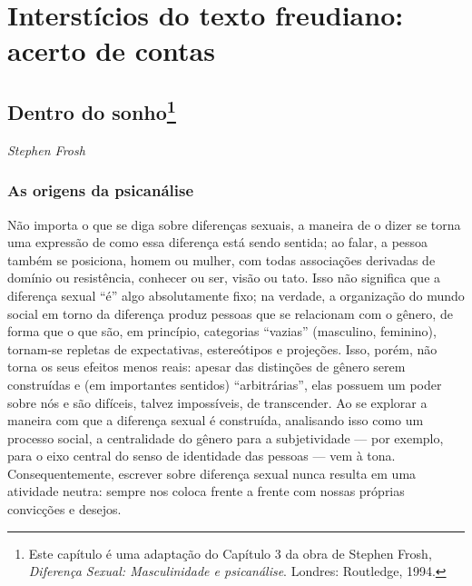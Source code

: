 \part{Interstícios do texto freudiano:\\ acerto de contas}

\chapter*{Dentro do sonho\footnote{Este capítulo é uma adaptação do
  Capítulo 3 da obra de Stephen Frosh, \emph{Diferença Sexual:
  Masculinidade e psicanálise}. Londres: Routledge, 1994.}}


\begin{flushright}
\emph{Stephen Frosh}
\end{flushright}

\section{As origens da psicanálise}

Não importa o que se diga sobre diferenças sexuais, a maneira de o dizer
se torna uma expressão de como essa diferença está sendo sentida; ao
falar, a pessoa também se posiciona, homem ou mulher, com todas
associações derivadas de domínio ou resistência, conhecer ou ser, visão
ou tato. Isso não significa que a diferença sexual ``é'' algo
absolutamente fixo; na verdade, a organização do mundo social em torno
da diferença produz pessoas que se relacionam com o gênero, de forma que
o que são, em princípio, categorias ``vazias'' (masculino, feminino),
tornam-se repletas de expectativas, estereótipos e projeções. Isso,
porém, não torna os seus efeitos menos reais: apesar das distinções de
gênero serem construídas e (em importantes sentidos) ``arbitrárias'',
elas possuem um poder sobre nós e são difíceis, talvez impossíveis, de
transcender. Ao se explorar a maneira com que a diferença sexual é
construída, analisando isso como um processo social, a centralidade do
gênero para a subjetividade --- por exemplo, para o eixo central do senso
de identidade das pessoas --- vem à tona. Consequentemente, escrever
sobre diferença sexual nunca resulta em uma atividade neutra: sempre nos
coloca frente a frente com nossas próprias convicções e desejos.

